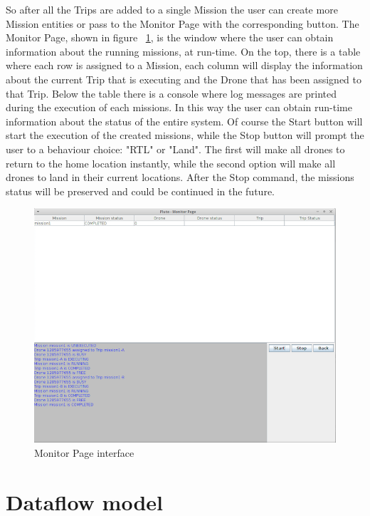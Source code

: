 So after all the Trips are added to a single Mission the user can create more Mission entities  or pass to the Monitor Page with the corresponding button.
The Monitor Page, shown in figure ~\ref{fig:MonitorPage}, is the window where the user can obtain information about the running missions, at run-time. On the top, there is a table where each row is assigned to a Mission, each column will display the information about the current Trip that is executing and the Drone that has been assigned to that Trip.
Below the table there is a console where log messages are printed during the execution of each missions. In this way the user can obtain run-time information about the status of the entire system. 
Of course the Start button will start the execution of the created missions, while the Stop button will prompt the user to a behaviour choice: "RTL" or "Land". The first will make all drones to return to the home location instantly, while the second option will make all drones to land in their current locations. After the Stop command, the missions status will be preserved and could be continued in the future.

\begin{figure}[H]
  \centering
  \includegraphics[width=\linewidth]{pictures/MonitorPage.png}
  \caption{Monitor Page interface}
  \label{fig:MonitorPage}
\end{figure}

\newpage

\section{Dataflow model}\label{dataFlow}

